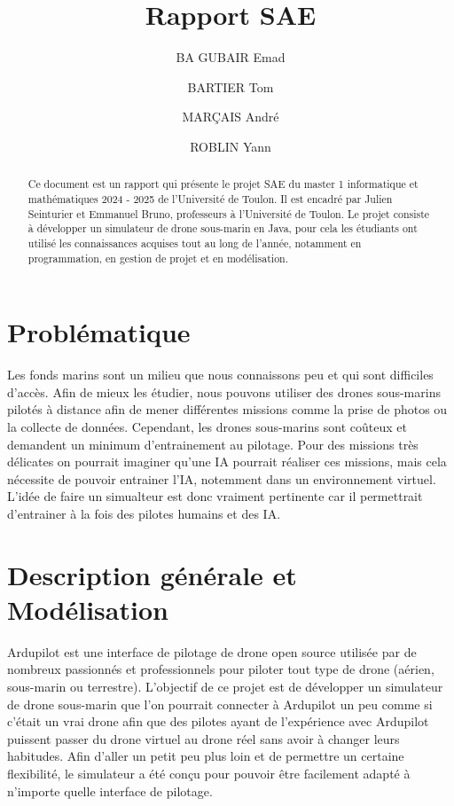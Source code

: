 \documentclass{scrartcl}
\title{Rapport SAE}
\author{BA GUBAIR Emad \and BARTIER Tom \and MARÇAIS André \and ROBLIN Yann}
\begin{document}
\maketitle{}

\begin{abstract}
    Ce document est un rapport qui présente le projet SAE du master 1 informatique et mathématiques 2024 - 2025
    de l'Université de Toulon. Il est encadré par Julien Seinturier et Emmanuel Bruno, professeurs à l'Université de Toulon.
    Le projet consiste à développer un simulateur de drone sous-marin en Java, pour cela les étudiants
    ont utilisé les connaissances acquises tout au long de l'année, notamment en programmation, en gestion de projet et
    en modélisation.
\end{abstract}

\tableofcontents

\section{Problématique}
Les fonds marins sont un milieu que nous connaissons peu et qui sont difficiles d'accès.
Afin de mieux les étudier, nous pouvons utiliser des drones sous-marins pilotés à distance
afin de mener différentes missions comme la prise de photos ou la collecte de données.
Cependant, les drones sous-marins sont coûteux et demandent un minimum d'entrainement au pilotage.
Pour des missions très délicates on pourrait imaginer qu'une IA pourrait réaliser ces missions, mais cela
nécessite de pouvoir entrainer l'IA, notemment dans un environnement virtuel. L'idée de faire un simualteur
est donc vraiment pertinente car il permettrait d'entrainer à la fois des pilotes humains et des IA.

\section{Description générale et Modélisation}
Ardupilot est une interface de pilotage de drone open source utilisée par de nombreux passionnés et professionnels
pour piloter tout type de drone (aérien, sous-marin ou terrestre). L'objectif de ce projet est de développer un simulateur
de drone sous-marin que l'on pourrait connecter à Ardupilot un peu comme si c'était un vrai drone afin que des pilotes ayant de l'expérience
avec Ardupilot puissent passer du drone virtuel au drone réel sans avoir à changer leurs habitudes. Afin d'aller un petit peu plus loin et de permettre
un certaine flexibilité, le simulateur a été conçu pour pouvoir être facilement adapté à n'importe quelle interface de pilotage.
\\
\end{document}
